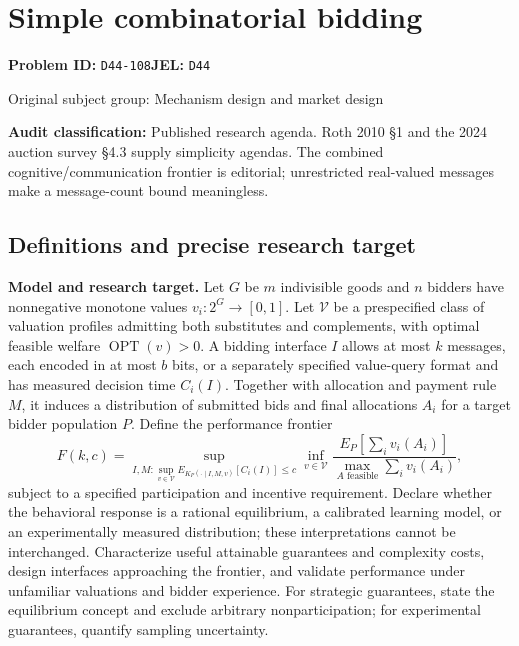\documentclass[11pt,a4paper]{article}
\begin{document}
\section*{Simple combinatorial bidding}
\textbf{Problem ID:} \texttt{D44-108}\quad \textbf{JEL:} \texttt{D44}\par
\label{problem:OP-0294}
{\sffamily\small\color{muted}Original subject group: Mechanism design and market design\par}
\label{definitions:problem:30007576}
\textbf{Audit classification:} Published research agenda. Roth 2010 §1 and the 2024 auction survey §4.3 supply simplicity agendas. The combined cognitive/communication frontier is editorial; unrestricted real-valued messages make a message-count bound meaningless.
\subsection*{Definitions and precise research target}
\textbf{Model and research target.} Let \(G\) be \(m\) indivisible goods and \(n\) bidders have nonnegative monotone values \(v_i:2^G\to[0,1]\). Let \(\mathcal V\) be a prespecified class of valuation profiles admitting both substitutes and complements, with optimal feasible welfare \(\operatorname{OPT}(v)>0\). A bidding interface \(I\) allows at most \(k\) messages, each encoded in at most \(b\) bits, or a separately specified value-query format and has measured decision time \(C_i(I)\). Together with allocation and payment rule \(M\), it induces a distribution of submitted bids and final allocations \(A_i\) for a target bidder population \(P\). Define the performance frontier
\[
 F(k,c)=\sup_{I,M:\sup_{v\in\mathcal V}E_{K_P(\cdot\mid I,M,v)}[C_i(I)]\leq c}
 \inf_{v\in\mathcal V}\frac{E_P[\sum_i v_i(A_i)]}{\max_{A\text{ feasible}}\sum_i v_i(A_i)},
\]
subject to a specified participation and incentive requirement. Declare whether the behavioral response is a rational equilibrium, a calibrated learning model, or an experimentally measured distribution; these interpretations cannot be interchanged. Characterize useful attainable guarantees and complexity costs, design interfaces approaching the frontier, and validate performance under unfamiliar valuations and bidder experience. For strategic guarantees, state the equilibrium concept and exclude arbitrary nonparticipation; for experimental guarantees, quantify sampling uncertainty.
\end{document}
